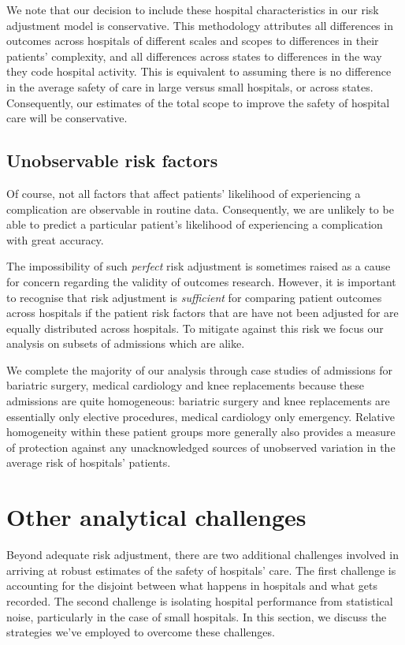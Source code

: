 \documentclass[submission]{grattan}
\begin{document}
We note that our decision to include these hospital characteristics in our risk adjustment model is conservative.
This methodology attributes all differences in outcomes across hospitals of different scales and scopes to differences in their patients' complexity, and all differences across states to differences in the way they code hospital activity.
This is equivalent to assuming there is no difference in the average safety of care in large versus small hospitals, or across states.
Consequently, our estimates of the total scope to improve the safety of hospital care will be conservative.

\subsection{Unobservable risk factors}\label{subsec:unobservable-risk-factors}

Of course, not all factors that affect patients' likelihood of experiencing a complication are observable in routine data.
Consequently, we are unlikely to be able to predict a particular patient's likelihood of experiencing a complication with great accuracy.

The impossibility of such \emph{perfect} risk adjustment is sometimes raised as a cause for concern regarding the validity of outcomes research.
However, it is important to recognise that risk adjustment is \emph{sufficient} for comparing patient outcomes across hospitals if the patient risk factors that are have not been adjusted for are equally distributed across hospitals.
To mitigate against this risk we focus our analysis on subsets of admissions which are alike.

We complete the majority of our analysis through case studies of admissions for bariatric surgery, medical cardiology and knee replacements because these admissions are quite homogeneous: bariatric surgery and knee replacements are essentially only elective procedures, medical cardiology only emergency.
Relative homogeneity within these patient groups more generally also provides a measure of protection against any unacknowledged sources of unobserved variation in the average risk of hospitals' patients.

\section{Other analytical challenges}\label{sec:other-analytical-challenges}

Beyond adequate risk adjustment, there are two additional challenges involved in arriving at robust estimates of the safety of hospitals' care.
The first challenge is accounting for the disjoint between what happens in hospitals and what gets recorded.
The second challenge is isolating hospital performance from statistical noise, particularly in the case of small hospitals.
In this section, we discuss the strategies we've employed to overcome these challenges.
\end{document}
